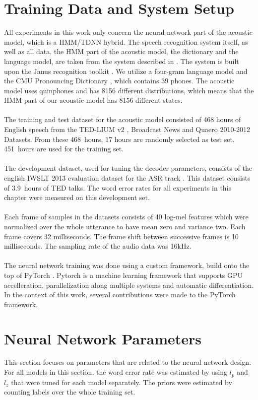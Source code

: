 \section{Training Data and System Setup}
All experiments in this work only concern the neural network part of the acoustic model, which is a HMM/TDNN hybrid. The speech recognition system itself, as well as all data, the HMM part of the acoustic model, the dictionary and the language model, are taken from the system described in \cite{nguyen20162016}. The system is built upon the Janus recognition toolkit \cite{finke1997karlsruhe}. We utilize a four-gram language model and the CMU Pronouncing Dictionary \cite{cmudict}, which contains 39 phones. The acoustic model uses quinphones and has 8156 different distributions, which means that the HMM part of our acoustic model has 8156 different states. \\ \\
The training and test dataset for the acoustic model consisted of 468 hours of English speech from the TED-LIUM v2 \cite{rousseau2014enhancing}, Broadcast News \cite{graff19971996} and Quaero 2010-2012 Datasets. From these 468~hours, 17 hours are randomly selected as test set, 451~hours are used for the training set. \\ \\
The development dataset, used for tuning the decoder parameters, consists of the english IWSLT 2013 evaluation dataset for the ASR track \cite{cettolo2013report}. This dataset consists of 3.9~hours of TED talks. The word error rates for all experiments in this chapter were measured on this development set. \\ \\ 
Each frame of samples in the datasets consists of 40 log-mel features which were normalized over the whole utterance to have mean zero and variance two. Each frame covers 32 milliseconds. The frame shift between successive frames is 10 milliseconds. The sampling rate of the audio data was 16kHz. \\ \\
The neural network training was done using a custom framework, build onto the top of PyTorch \cite{paszke2017automatic}. Pytorch is a machine learning framework that supports GPU accelleration, parallelization along multiple systems and automatic differentiation. In the context of this work, several contributions were made to the PyTorch framework.  
\section{Neural Network Parameters}
This section focuses on parameters that are related to the neural network design. For all models in this section, the word error rate was estimated by using $l_p$ and $l_z$ that were tuned for each model separately. The priors were estimated by counting labels over the whole training set.
